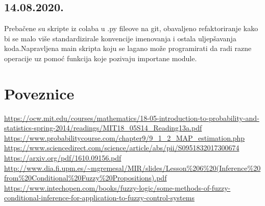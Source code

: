 		\subsection{14.08.2020.}
			Prebačene su skripte iz colaba u .py fileove na git, obavaljeno refaktoriranje kako bi se malo više standardizirale konvencije imenovanja i ostala uljepšavanja koda.Napravljena main skripta koju se lagano može programirati da radi razne operacije uz pomoć funkcija koje pozivaju importane module.
	\section{Poveznice}
	\url{https://ocw.mit.edu/courses/mathematics/18-05-introduction-to-probability-and-statistics-spring-2014/readings/MIT18_05S14_Reading13a.pdf}\newline
	\url{https://www.probabilitycourse.com/chapter9/9_1_2_MAP_estimation.php}\newline
	\url{https://www.sciencedirect.com/science/article/abs/pii/S0951832017300674}\newline
	\url{https://arxiv.org/pdf/1610.09156.pdf}\newline
	\url{http://www.dia.fi.upm.es/~mgremesal/MIR/slides/Lesson\%206\%20(Inference\%20from\%20Conditional\%20Fuzzy\%20Propositions).pdf}\newline
	\url{https://www.intechopen.com/books/fuzzy-logic/some-methods-of-fuzzy-conditional-inference-for-application-to-fuzzy-control-systems}